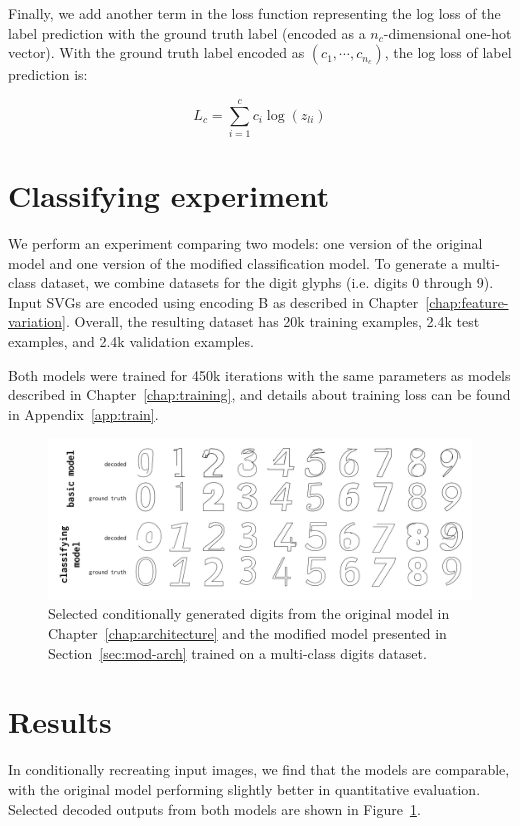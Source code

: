 Finally, we add another term in the loss function representing the log loss of the label prediction with the ground truth label (encoded as a $n_c$-dimensional one-hot vector).
With the ground truth label encoded as $(c_1, \cdots, c_{n_c})$, the log loss of label prediction is:

\begin{equation}
L_c = \sum_{i=1}^c c_i \log(z_{li})
\end{equation}

\section{Classifying experiment}
We perform an experiment comparing two models: one version of the original model and one version of the modified classification model.
To generate a multi-class dataset, we combine datasets for the digit glyphs (i.e. digits 0 through 9).
Input SVGs are encoded using encoding B as described in Chapter~\ref{chap:feature-variation}.
Overall, the resulting dataset has 20k training examples, 2.4k test examples, and 2.4k validation examples.

Both models were trained for 450k iterations with the same parameters as models described in Chapter~\ref{chap:training}, and details about training loss can be found in Appendix~\ref{app:train}.

\begin{figure}[h]
    \centering
	\includegraphics[width=\textwidth]{figures/digits}
    \caption[Visual results for the multi-class digits models]
    {Selected conditionally generated digits from the original model in Chapter~\ref{chap:architecture} and the modified model presented in Section~\ref{sec:mod-arch} trained on a multi-class digits dataset.\label{fig:class-results}}
\end{figure}

\section{Results}
In conditionally recreating input images, we find that the models are comparable, with the original model performing slightly better in quantitative evaluation. Selected decoded outputs from both models are shown in Figure~\ref{fig:class-results}.

